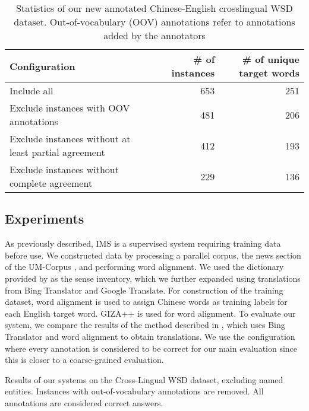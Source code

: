 {\begin{table}[ht]
	\caption{Statistics of our new annotated Chinese-English crosslingual WSD dataset. Out-of-vocabulary (OOV) annotations refer to annotations added by the annotators}
	\label{table:CLWSD-test-stats-no-ne}
	\begin{center}
		\begin{tabular}{| p{8cm} | r| r|}
			\hline
			{\bf Configuration} & {\bf \# of instances} & {\bf \# of unique target words} \\
			\hline
			Include all & 653 & 251\\ 
			\hline
			Exclude instances with OOV annotations & 481 & 206 \\						
			\hline
			Exclude instances without at least partial agreement & 412 & 193 \\
			\hline
			Exclude instances without complete agreement & 229 & 136 \\
			\hline
		\end{tabular}
	\end{center}
\end{table}

\subsection{Experiments}

As previously described, IMS is a supervised system requiring training data before use. We constructed data by processing a parallel corpus, the news section of the UM-Corpus \cite{tian2014corpus}, and performing word alignment. We used the dictionary provided by \cite{tao2014} as the sense inventory, which we further expanded using translations from Bing Translator and Google Translate. For construction of the training dataset, word alignment is used to assign Chinese words as training labels for each English target word. GIZA++ \cite {och03} is used for word alignment. To evaluate our system, we compare the results of the method described in \cite{tao2014}, which uses Bing Translator and word alignment to obtain translations. We use the configuration where every annotation is considered to be correct for our main evaluation since this is closer to a coarse-grained evaluation. 

\begin{table}[ht]
	\caption{Results of our systems on the Cross-Lingual WSD dataset, excluding named entities. Instances with out-of-vocabulary annotations are removed. All annotations are considered correct answers.}
	\label{table:CLWSD-test-results}
	\begin{center}


\end{center}
\end{table}}
